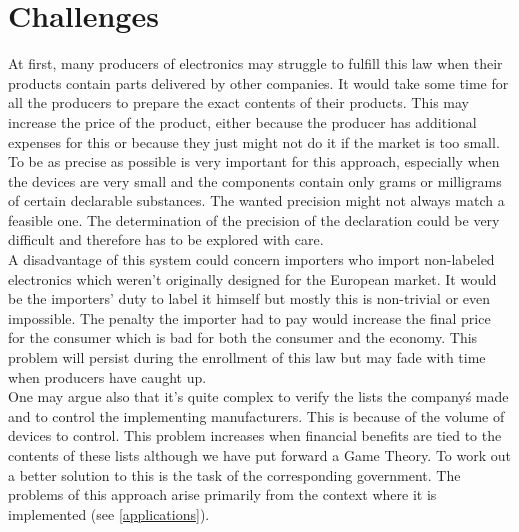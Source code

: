 \section{Challenges}
At first, many producers of electronics may struggle to fulfill this law when their products contain parts delivered by other companies. It would take some time for all the producers to prepare the exact contents of their products. This may increase the price of the product, either because the producer has additional expenses for this or because they just might not do it if the market is too small.\\
To be as precise as possible is very important for this approach, especially when the devices are very small and the components contain only grams or milligrams of certain declarable substances. The wanted precision might not always match a feasible one. The determination of the precision of the declaration could be very difficult and therefore has to be explored with care.\\
A disadvantage of this system could concern importers who import non-labeled electronics which weren't originally designed for the European market. It would be the importers' duty to label it himself but mostly this is non-trivial or even impossible. The penalty the importer had to pay would increase the final price for the consumer which is bad for both the consumer and the economy. This problem will persist during the enrollment of this law but may fade with time when producers have caught up.\\
One may argue also that it's quite complex to verify the lists the company\'s made and to control the implementing manufacturers. This is because of the volume of devices to control. This problem increases when financial benefits are tied to the contents of these lists although we have put forward a Game Theory. To work out a better solution to this is the task of the corresponding government.
The problems of this approach arise primarily from the context where it is implemented (see \ref{applications}).